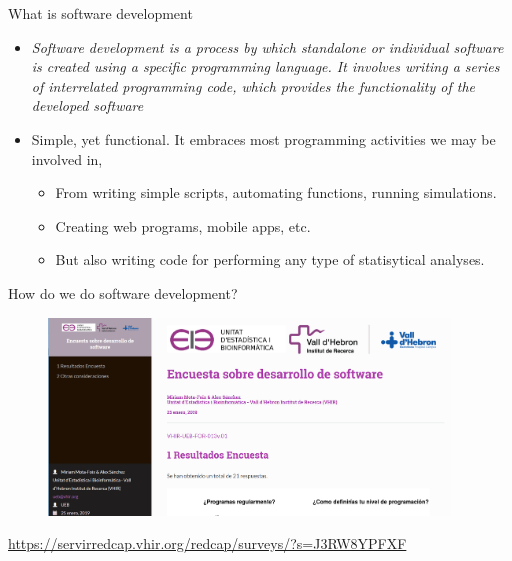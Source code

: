 \documentclass[ignorenonframetext,]{beamer}
\providecommand{\tightlist}{%
  \setlength{\itemsep}{0pt}\setlength{\parskip}{0pt}}
\begin{document}
\begin{frame}{%
\protect\hypertarget{what-is-software-development}{%
What is software development}}

\begin{itemize}
\item
  \emph{Software development is a process by which standalone or
  individual software is created using a specific programming language.
  It involves writing a series of interrelated programming code, which
  provides the functionality of the developed software}
\item
  Simple, yet functional. It embraces most programming activities we may
  be involved in,

  \begin{itemize}
  \tightlist
  \item
    From writing simple scripts, automating functions, running
    simulations.
  \item
    Creating web programs, mobile apps, etc.
  \item
    But also writing code for performing any type of statisytical
    analyses.
  \end{itemize}
\end{itemize}

\end{frame}

\begin{frame}{%
\protect\hypertarget{how-do-we-do-software-development}{%
How do we do software development?}}

\begin{figure}
\includegraphics[width=0.95\textwidth]{"images/programmingSurvey"}
\end{figure}

\url{https://servirredcap.vhir.org/redcap/surveys/?s=J3RW8YPFXF}

\end{frame}
\end{document}
